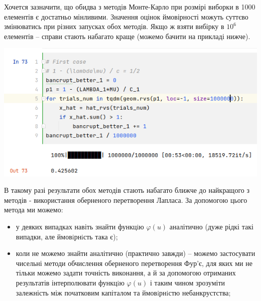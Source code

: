 \documentclass{article}
\begin{document}
    Хочется зазначити, що обидва з методів Монте-Карло при розмірі виборки в 1000 елементів є 
    достатньо мінливими. Значення оцінок ймовірності можуть суттєво змінюватись при різних 
    запусках обох методів. Якщо ж взяти вибірку в $10^6$ елементів -- справи стають набагато краще 
    (можемо бачити на прикладі нижче).

    \includegraphics[scale=0.5]{img/2021-10-11-18-53-04.png}

    В такому разі результати обох методів стають набагато ближче до найкращого з методів - 
    використання оберненого перетворення Лапласа. За допомогою цього метода ми можемо:
    \begin{itemize}
        \item у деяких 
        випадках навіть знайти функцiю $\varphi(u)$ аналітично (дуже рідкі такі випадки, 
        але ймовiрнiсть така є);
        \item коли не можемо знайти аналітично (практично завжди) -- можемо застосувати 
        чисельні методи обчислення оберненого перетворення Фур'є, для яких ми не тільки можемо 
        задати точність виконання, а й за допомогою отриманих результатів інтерполювати функцiю 
        $\varphi(u)$ і таким чином зрозуміти залежність між початковим капіталом та ймовiрнiстю 
        небанкрустства;
    \end{itemize}
    
\end{document}
